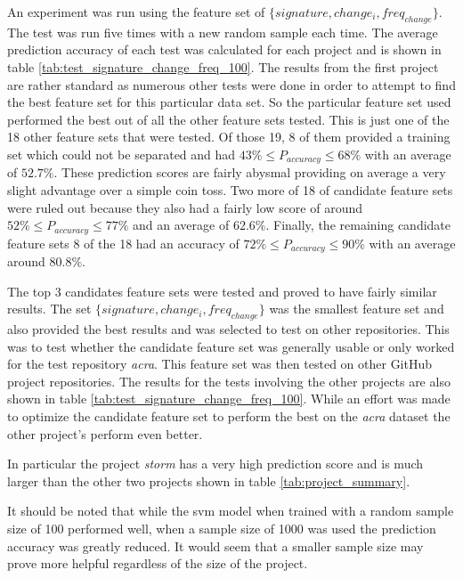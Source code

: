 An experiment was run using the feature set of $\{signature, change_i, freq_{change}\}$. The test was run five times with a new random sample each time. The average prediction accuracy of each test was calculated for each project and is shown in table \ref{tab:test_signature_change_freq_100}. The results from the first project are rather standard as numerous other tests were done in order to attempt to find the best feature set for this particular data set. So the particular feature set used performed the best out of all the other feature sets tested. This is just one of the 18 other feature sets that were tested. Of those 19, 8 of them provided a training set which could not be separated and had $43\% \leq P_{accuracy} \leq 68\%$ with an average of $52.7\%$. These prediction scores are fairly abysmal providing on average a very slight advantage over a simple coin toss. Two more of 18 of candidate feature sets were ruled out because they also had a fairly low score of around $52\% \leq P_{accuracy} \leq 77\%$ and an average of $62.6\%$. Finally, the remaining candidate feature sets 8 of the 18 had an accuracy of $72\% \leq P_{accuracy} \leq 90\%$ with an average around $80.8\%$. 

The top 3 candidates feature sets were tested and proved to have fairly similar results. The set $\{signature, change_i, freq_{change}\}$ was the smallest feature set and also provided the best results and was selected to test on other repositories. This was to test whether the candidate feature set was generally usable or only worked for the test repository \textit{acra}. This feature set was then tested on other GitHub project repositories. The results for the tests involving the other projects are also shown in table \ref{tab:test_signature_change_freq_100}. While an effort was made to optimize the candidate feature set to perform the best on the \textit{acra} dataset the other project's perform even better.

In particular the project \textit{storm} has a very high prediction score and is much larger than the other two projects shown in table \ref{tab:project_summary}.

It should be noted that while the \gls{svm} model when trained with a random sample size of 100 performed well, when a sample size of 1000 was used the prediction accuracy was greatly reduced. It would seem that a smaller sample size may prove more helpful regardless of the size of the project. 


